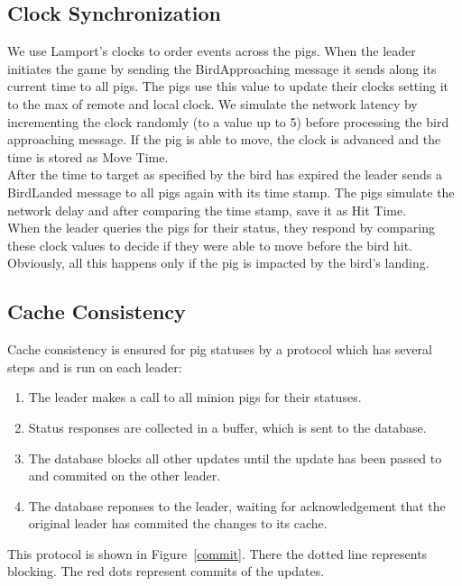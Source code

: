 \documentclass[]{article}
\begin{document}
\subsection{Clock Synchronization}
We use Lamport's clocks to order events across the pigs. When the leader initiates the game by sending the BirdApproaching 
message it sends along its current time to all pigs. The pigs use this value to update their clocks setting it to the max of remote 
and local clock. We simulate the network latency by incrementing the clock randomly (to a value up to 5) before processing the
bird approaching message. If the pig is able to move, the clock is advanced and the time is stored as Move Time. \\
After the time to target as specified by the bird has expired the leader sends a BirdLanded message to all pigs again with its time stamp. 
The pigs simulate the network delay and after comparing the time stamp, save it as Hit Time.\\
When the leader queries the pigs for their status, they respond by comparing these clock values to decide if they were able to move before the bird hit. 
Obviously, all this happens only if the pig is impacted by the bird's landing.  

\subsection{Cache Consistency}

Cache consistency is ensured for pig statuses by a protocol which has several steps and is run on each leader:

\begin{enumerate}[1.]
    \item
        The leader makes a call to all minion pigs for their statuses.
    \item
        Status responses are collected in a buffer, which is sent to the database.
    \item
        The database blocks all other updates until the update has been passed to and commited on the other leader.
    \item
        The database reponses to the leader, waiting for acknowledgement that the original leader has commited the changes to its cache.
\end{enumerate}

This protocol is shown in Figure~\ref{commit}. There the dotted line represents
blocking. The red dots represent commits of the updates. 
\end{document}
